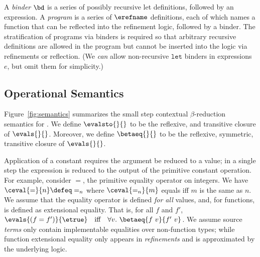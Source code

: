 %
A \emph{binder} $\bd$ is a series of possibly recursive
let definitions, followed by an expression.
%
A \emph{program} \prog is a series of $\erefname$
definitions, each of which names a function
that can be reflected into the refinement
logic, followed by a binder.
%
The stratification of programs via binders
is required so that arbitrary recursive definitions
are allowed in the program but cannot be inserted into the logic
via refinements or reflection.
%
(We \emph{can} allow non-recursive $\mathtt{let}$
binders in expressions $e$, but omit them for simplicity.)

\subsection{Operational Semantics}

Figure~\ref{fig:semantics} summarizes the small
step contextual $\beta$-reduction semantics for
\corelan.
%
We define $\evalsto{}{}$ to be the reflexive,
and transitive closure of $\evals{}{}$.
%
Moreover, we define $\betaeq{}{}$ to be the reflexive,
symmetric, transitive closure of $\evals{}{}$.

 Application of a constant requires the
argument be reduced to a value; in a single step the
expression is reduced to the output of the primitive
constant operation.
%
For example, consider $=$, the primitive equality
operator on integers.
%
We have $\ceval{=}{n} \defeq =_n$
where $\ceval{=_n}{m}$ equals \etrue
iff $m$ is the same as $n$.
%
%
We assume that the equality operator
is defined \emph{for all} values,
and, for functions, is defined as
extensional equality.
%
That is, for all
$f$ and
$f'$,
$\evals{(f = f')}{\etrue}
  \quad \mbox{iff} \quad
  \forall v.\ \betaeq{f\ v}{f'\ v}$.
%
We assume source \emph{terms} only contain implementable equalities
over non-function types; while function extensional equality only appears
in \emph{refinements} and is approximated by the underlying logic.


